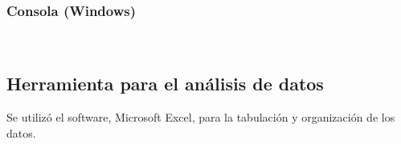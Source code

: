 \subsubsection{Consola (Windows)}\mbox{} \\ \label{ins:cons} 

\subsection{Herramienta para el an\'alisis de datos} \label{ins:toolsAn}
Se utiliz\'o el software, Microsoft Excel, para la tabulaci\'on y organizaci\'on de los datos.